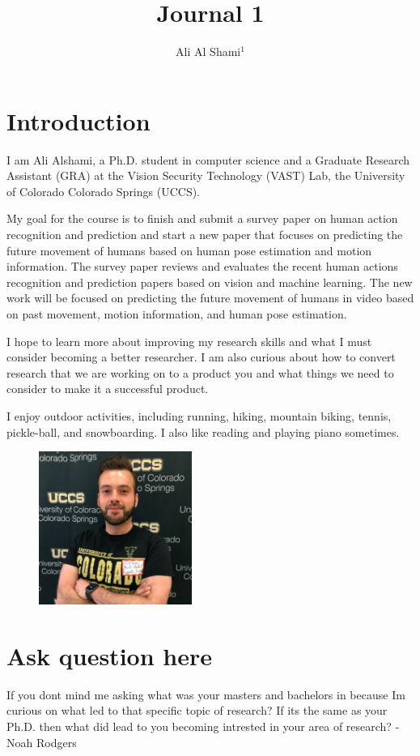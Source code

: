 \documentclass[conference]{IEEEtran}
\author{Ali Al Shami$^{1}$}
\begin{document}
\title{Journal 1}
\maketitle

\section{Introduction}
I am Ali Alshami, a Ph.D. student in computer science and a Graduate Research Assistant (GRA) at the Vision Security Technology (VAST) Lab, the University of Colorado Colorado Springs (UCCS).

My goal for the course is to finish and submit a survey paper on human action recognition and prediction and start a new paper that focuses on predicting the future movement of humans based on human pose estimation and motion information. The survey paper reviews and evaluates the recent human actions recognition and prediction papers based on vision and machine learning. The new work will be focused on predicting the future movement of humans in video based on past movement, motion information, and human pose estimation.

I hope to learn more about improving my research skills and what I must consider becoming a better researcher. I am also curious about how to convert research that we are working on to a product you and what things we need to consider to make it a successful product.

I enjoy outdoor activities, including running, hiking, mountain biking, tennis, pickle-ball, and snowboarding. I also like reading and playing piano sometimes.
\begin{figure}[hbt!]
    \centering
    \includegraphics[width=5cm]{alshami.jpg}
    \caption{ }
    \label{fig:Remove}
\end{figure}
\section{Ask question here}
If you dont mind me asking what was your masters and bachelors in because Im curious on what led to that specific topic of research? If its the same as your Ph.D. then what did lead to you becoming intrested in your area of research? -Noah Rodgers



\end{document}
